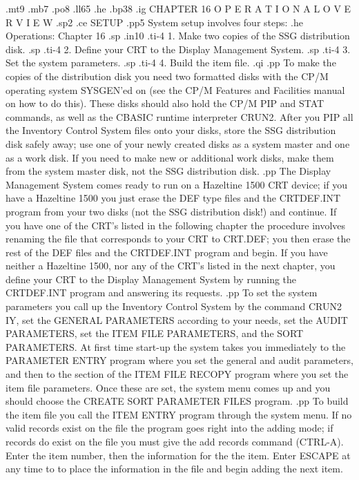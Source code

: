 .mt9
.mb7
.po8
.ll65
.he
.bp38
.ig
CHAPTER 16
O P E R A T I O N A L	O V E R V I E W
.sp2
.ce
SETUP
.pp5
System setup involves four steps:
.he Operations: Chapter 16
.sp
.in10
.ti-4
1.  Make two copies of the SSG distribution disk.
.sp
.ti-4
2.  Define your CRT to the Display Management System.
.sp
.ti-4
3.  Set the system parameters.
.sp
.ti-4
4.  Build the item file.
.qi
.pp
To make the copies of the distribution disk you need two formatted
disks with the CP/M operating system SYSGEN'ed on (see the CP/M Features
and Facilities manual on how to do this).  These disks should also
hold the CP/M PIP and STAT commands, as well as the CBASIC runtime
interpreter CRUN2.  After you PIP all the Inventory Control System files
onto your disks, store the SSG distribution disk safely away; use one
of your newly created disks as a system master and one as a work disk.
If you need to make new or additional work disks, make them from the
system master disk, not the SSG distribution disk.
.pp
The Display Management System comes ready to run on a Hazeltine 1500
CRT device; if you have a Hazeltine 1500 you just erase the DEF type
files and the CRTDEF.INT program from your two disks
(not the SSG distribution disk!) and continue.	 If you have one
of the CRT's listed in the following chapter the procedure involves
renaming the file that corresponds to your CRT to CRT.DEF; you then
erase the rest of the DEF files and the CRTDEF.INT program and begin.
If you have neither a Hazeltine 1500, nor any of the CRT's listed in the
next chapter, you define your CRT to the Display Management System by
running the CRTDEF.INT program and answering its requests.
.pp
To set the system parameters you call up the Inventory Control System
by the command CRUN2 IY, set the GENERAL PARAMETERS according to your
needs, set the AUDIT PARAMETERS, set the ITEM FILE PARAMETERS, and
the SORT PARAMETERS.  At first time start-up the system takes you
immediately to the PARAMETER ENTRY program where you set the general
and audit parameters, and then to the section of the ITEM FILE RECOPY
program where you set the item file parameters.  Once these are set, the
system menu comes up and you should choose
the CREATE SORT PARAMETER FILES program.
.pp
To build the item file you call the ITEM ENTRY program through the system
menu.  If no valid records exist on the file the program goes right into
the adding mode; if records do exist on the file you must give the
add records command (CTRL-A).  Enter the item number, then the information
for the the item.  Enter ESCAPE at any time to to place the information in
the file and begin adding the next item.
